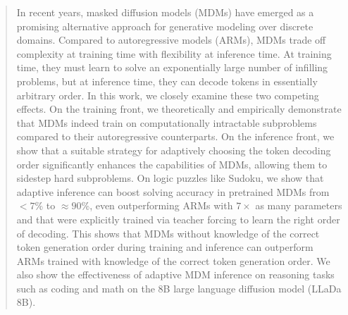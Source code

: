 \documentclass{article}
\theoremstyle{plain}
\theoremstyle{definition}
\theoremstyle{remark}
\newcounter{theo}
\begin{document}

\printAffiliationsAndNotice{\icmlEqualContribution}

\begin{abstract}
In recent years, masked diffusion models (MDMs) have emerged as a promising alternative approach for generative modeling over discrete domains. Compared to autoregressive models (ARMs), MDMs trade off complexity at training time with flexibility at inference time. At training time, they must learn to solve an exponentially large number of infilling problems, but at inference time, they can decode tokens in essentially arbitrary order. In this work, we closely examine these two competing effects. On the training front, we theoretically and empirically demonstrate that MDMs indeed train on computationally intractable subproblems compared to their autoregressive counterparts. On the inference front, we show that a suitable strategy for adaptively choosing the token decoding order significantly enhances the capabilities of MDMs, allowing them to sidestep hard subproblems. On logic puzzles like Sudoku, we show that adaptive inference can boost solving accuracy in pretrained MDMs from $<7$\% to $\approx 90$\%, even outperforming ARMs with $7\times$ as many parameters and that were explicitly trained via teacher forcing to learn the right order of decoding. This shows that MDMs without knowledge of the correct token generation order during training and inference can outperform ARMs trained with knowledge of the correct token generation order. We also show the effectiveness of adaptive MDM inference on reasoning tasks such as coding and math on the 8B large language diffusion model (LLaDa 8B). 
\end{abstract}
\end{document}
